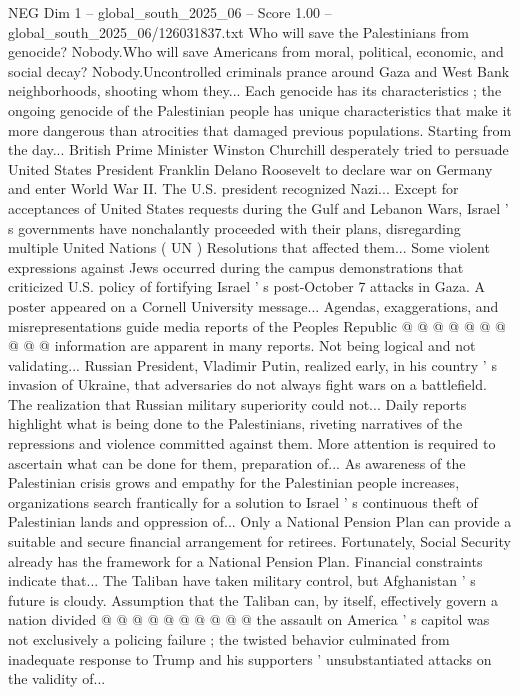 \begin{textsample}{NEG Dim 1 – global\_south\_2025\_06 – Score 1.00 – global\_south\_2025\_06/126031837.txt}  \label{ex:f1_neg_242}
Who will save the Palestinians from genocide?
Nobody.Who will save Americans from moral, political, economic, and social decay?
Nobody.Uncontrolled criminals prance around Gaza and West Bank neighborhoods, shooting whom they...
Each genocide has its characteristics ; the ongoing genocide of the Palestinian people has unique characteristics that make it more dangerous than atrocities that damaged previous populations.
Starting from the day...
British Prime Minister Winston Churchill desperately tried to persuade United States President Franklin Delano Roosevelt to declare war on Germany and enter World War II.
The U.S. president recognized Nazi...
Except for acceptances of United States requests during the Gulf and Lebanon Wars, Israel ' s governments have nonchalantly proceeded with their plans, disregarding multiple United Nations ( UN ) Resolutions that affected them...
Some violent expressions against Jews occurred during the campus demonstrations that criticized U.S. policy of fortifying Israel ' s post-October 7 attacks in Gaza.
A poster appeared on a Cornell University message...
Agendas, exaggerations, and misrepresentations guide media reports of the Peoples Republic @ @ @ @ @ @ @ @ @ @ information are apparent in many reports.
Not being logical and not validating...
Russian President, Vladimir Putin, realized early, in his country ' s invasion of Ukraine, that adversaries do not always fight wars on a battlefield.
The realization that Russian military superiority could not...
Daily reports highlight what is being done to the Palestinians, riveting narratives of the repressions and violence committed against them.
More attention is required to ascertain what can be done for them, preparation of...
As awareness of the Palestinian crisis grows and empathy for the Palestinian people increases, organizations search frantically for a solution to Israel ' s continuous theft of Palestinian lands and oppression of...
Only a National Pension Plan can provide a suitable and secure financial arrangement for retirees.
Fortunately, Social Security already has the framework for a National Pension Plan.
Financial constraints indicate that...
The Taliban have taken military control, but Afghanistan ' s future is cloudy.
Assumption that the Taliban can, by itself, effectively govern a nation divided @ @ @ @ @ @ @ @ @ @ the assault on America ' s capitol was not exclusively a policing failure ; the twisted behavior culminated from inadequate response to Trump and his supporters ' unsubstantiated attacks on the validity of...

\end{textsample}
